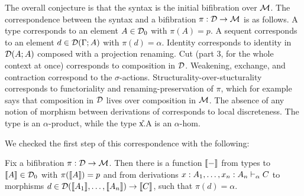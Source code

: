 The overall conjecture is that the syntax is the initial bifibration
over $\mathcal{M}$.  The correspondence between the syntax and a bifibration $\pi
: \mathcal{D} \to \mathcal{M}$ is as follows.  A type  corresponds to an
element $A \in \mathcal{D}_0$ with $\pi(A) = p$.  A sequent
 corresponds to an element $d \in \mathcal{D}(\Gamma;A)$
with $\pi(d) = \alpha$.  Identity  corresponds to
identity in $\mathcal{D}(A;A)$ composed with a projection renaming.  Cut (part 3,
for the whole context at once) corresponds to composition in $\mathcal{D}$.
Weakening, exchange, and contraction correspond to the $\sigma$-actions.
Structurality-over-stucturality corresponds to functoriality and
renaming-preservation of $\pi$, which for example says that composition
in $\mathcal{D}$ lives over composition in $\mathcal{M}$.  The absence of any notion of
morphism between derivations of  corresponds to
local discreteness.  The type \F{\alpha}{\Delta} is an $\alpha$-product,
while the type \U{x.\alpha}{\Delta}{A} is an $\alpha$-hom.

We checked the first step of this correspondence with the following:

\begin{theorem}
Fix a bifibration $\pi : \mathcal{D} \to \mathcal{M}$.  Then there is a function $\llbracket -
\rrbracket$ from types  to $\llbracket A \rrbracket \in \mathcal{D}_0$ with $\pi(\llbracket
A \rrbracket) = p$ and from derivations $x:A_1, \ldots,
  x_n:A_n \vdash_{\alpha} C$ to morphisms $d \in \mathcal{D}(\llbracket A_1 \rrbracket, \dots, \llbracket
A_n \rrbracket) \to \llbracket C \rrbracket$, such that $\pi(d) = \alpha$.
\end{theorem}

